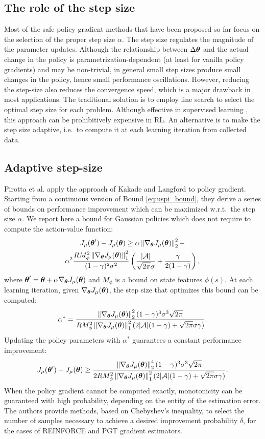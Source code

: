 \subsection{The role of the step size}
Most of the safe policy gradient methods that have been proposed so far focus on the selection of the proper step size $\alpha$.
The step size regulates the magnitude of the parameter updates. Although the relationship between $\Delta\vtheta$ and the actual change in the policy is parametrization-dependent (at least for vanilla policy gradients) and may be non-trivial, in general small step sizes produce small changes in the policy, hence small performance oscillations. However, reducing the step-size also reduces the convergence speed, which is a major drawback in most applications. 
The traditional solution is to employ line search to select the optimal step size for each problem. Although effective in supervised learning \cite{More:1994:LSA:192115.192132}, this approach can be prohibitively expensive in \ac{RL}. 
An alternative is to make the step size adaptive, i.e.\ to compute it at each learning iteration from collected data.

\subsection{Adaptive step-size}\label{sec:adaptive_ss}
Pirotta et al. \cite{NIPS2013_5186} apply the approach of Kakade and Langford \cite{kakade2002approximately} to policy gradient. Starting from a continuous version of Bound \ref{eq:uspi_bound}, they derive a series of bounds on performance improvement which can be maximized w.r.t.\ the step size $\alpha$. We report here a bound for Gaussian policies which does not require to compute the action-value function:
\begin{multline}\label{eq:pirotta_bound2}
J_{\mu}(\vtheta')-J_{\mu}(\vtheta) \geq \alpha\norm[2]{\gradJ{\vtheta}}^2 - \\
	\alpha^2\frac{RM_\phi^2\norm[1]{\gradJ{\vtheta}}^2}{(1-\gamma)^2\sigma^2}
	\left(\frac{|\mathcal{A}|}{\sqrt{2\pi}\sigma} + \frac{\gamma}{2(1-\gamma)}\right),
\end{multline}
where $\vtheta' = \vtheta+\alpha\gradJ{\vtheta}$ and $M_\phi$ is a bound on state features $\phi(s)$.
At each learning iteration, given $\gradJ{\vtheta}$, the step size that optimizes this bound can be computed:
\[
\alpha^* = \frac{\norm[2]{\gradJ{\vtheta}}^2(1-\gamma)^3\sigma^3\sqrt{2\pi}}
	{RM_\phi^2\norm[1]{\gradJ{\vtheta}}^2(2|\mathcal{A}|(1-\gamma)+\sqrt{2\pi}\sigma\gamma)}.
\] 
Updating the policy parameters with $\alpha^*$ guarantees a constant performance improvement:
\[
J_{\mu}(\vtheta')-J_{\mu}(\vtheta) \geq
	\frac{\norm[2]{\gradJ{\vtheta}}^4(1-\gamma)^3\sigma^3\sqrt{2\pi}}
	{2RM_\phi^2\norm[1]{\gradJ{\vtheta}}^2(2|\mathcal{A}|(1-\gamma)+\sqrt{2\pi}\sigma\gamma)}.
\]
When the policy gradient cannot be computed exactly, monotonicity can be guaranteed with high probability, depending on the entity of the estimation error. The authors provide methods, based on Chebyshev's inequality, to select the number of samples necessary to achieve a desired improvement probability $\delta$, for the cases of REINFORCE and PGT gradient estimators.
